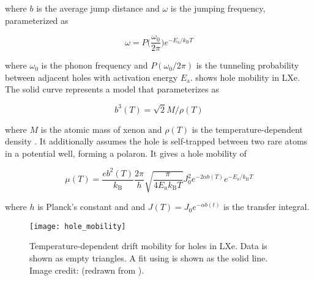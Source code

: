 \noindent where $b$ is the average jump distance and $\omega$ is the jumping frequency, parameterized as

\vspace{-20pt}

\begin{equation}
\omega = P \Big( \frac{\omega_0}{2 \pi} \Big) e^{-E_{\mathrm{a}} / k_{\mathrm{B}} T}
\end{equation}

\noindent where $\omega_0$ is the phonon frequency and $P(\omega_0 / 2 \pi)$ is the tunneling probability between adjacent holes with
activation energy $E_{\mathrm{a}}$.   shows hole mobility in
LXe.  The solid curve represents a model that parameterizes  as

\vspace{-15pt}

\begin{equation}
b^3(T) = \sqrt{2} M / \rho (T)
\end{equation}

\noindent where $M$ is the atomic mass of xenon and $\rho (T)$ is the temperature-dependent density .  It
additionally assumes the hole is self-trapped between two rare atoms in a potential well, forming a polaron.  It gives a hole mobility of

\vspace{-5pt}

\begin{equation}
\mu (T) = \frac{e b^2 (T)}{k_{\mathrm{B}}} \frac{2 \pi}{h} \sqrt{\frac{\pi}{4 E_a k_{\mathrm{B}} T}} J_0^2
e^{-2 \alpha b(T)} e^{-E_a / k_{\mathrm{B}} T}
\label{eq:importance_procedure_effects_charge_mobility_polaron}
\end{equation}

\noindent where $h$ is Planck's constant and and $J(T) = J_0 e^{-\alpha b(t)}$ is the transfer integral.

\begin{figure}
\centering
\texttt{[image: hole\_mobility]}
\caption{Temperature-dependent drift mobility for holes in LXe.  Data is shown as empty triangles.  A fit
using  is shown as the solid line.  Image credit: 
(redrawn from ).}
\label{fig:importance_procedure_effects_charge_hole_mobility}
\end{figure}

